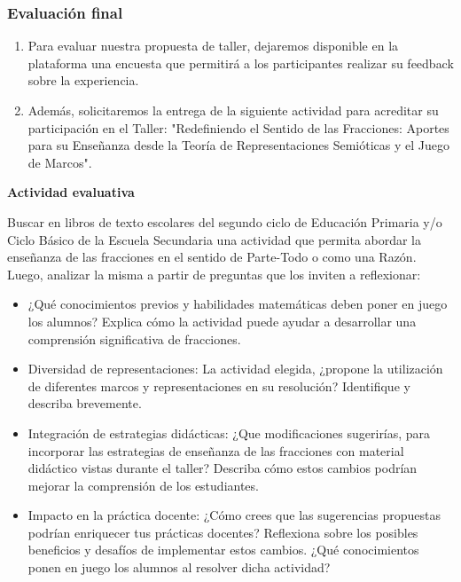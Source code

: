 \subsubsection{Evaluación final}

\begin{enumerate}
	\item Para evaluar nuestra propuesta de taller, dejaremos disponible en la plataforma una encuesta que permitirá a los participantes realizar su feedback sobre la experiencia.
	\item Además, solicitaremos la entrega de la siguiente actividad para acreditar su participación en el Taller: "Redefiniendo el Sentido de las Fracciones: Aportes para su Enseñanza desde la Teoría de Representaciones Semióticas y el Juego de Marcos".
\end{enumerate}

\bigskip
\begin{center}
	\begin{minipage}{0.8\linewidth}
		\textbf{Actividad evaluativa}
		
		Buscar en libros de texto escolares del segundo ciclo de Educación Primaria y/o Ciclo Básico de la Escuela Secundaria una actividad que permita abordar la enseñanza de las fracciones en el sentido de Parte-Todo o como una Razón. Luego, analizar la misma a partir de preguntas que los inviten
		a reflexionar:
		\begin{itemize}
			\item ¿Qué conocimientos previos y habilidades matemáticas deben poner en juego los alumnos? Explica cómo la actividad puede ayudar a desarrollar una comprensión significativa de fracciones.
			\item Diversidad de representaciones: La actividad elegida, ¿propone la utilización de diferentes marcos y representaciones en su resolución? Identifique y describa brevemente.
			\item Integración de estrategias didácticas: ¿Que modificaciones sugerirías, para incorporar las estrategias de enseñanza de las fracciones con material didáctico vistas durante el taller? Describa cómo estos cambios podrían mejorar la comprensión de los estudiantes.
			\item Impacto en la práctica docente: ¿Cómo crees que las sugerencias propuestas podrían enriquecer tus prácticas docentes? Reflexiona sobre los posibles beneficios y desafíos de implementar estos cambios. ¿Qué conocimientos ponen en juego los alumnos al resolver dicha actividad?
		\end{itemize}
	\end{minipage}
\end{center}
\bigskip


